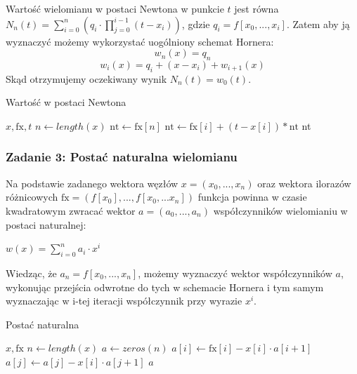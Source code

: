 \documentclass[11pt]{article}
\begin{document}
        \noindent Wartość wielomianu w postaci Newtona w punkcie $t$ jest równa
        $N_n(t) = \sum_{i = 0}^{n}(q_i \cdot \prod_{j = 0}^{i - 1}(t - x_i))$, gdzie $q_i = f[x_0, ..., x_i]$.
        Zatem aby ją wyznaczyć możemy wykorzystać uogólniony schemat Hornera:
        \[ w_n(x) = q_n \]
        \[ w_i(x) = q_i + (x - x_i) + w_{i+1}(x) \]
        Skąd otrzymujemy oczekiwany wynik $N_n(t) = w_0(t)$.

        \begin{algorithm}[h!]
        \caption{Wartość w postaci Newtona}\label{alg:newton_value}
        \begin{algorithmic}[1]
            \Require $x, \text{fx}, t$
            \State $n \gets length(x)$
            \State $\text{nt} \gets \text{fx}[n]$
                \State $\text{nt} \gets \text{fx}[i] + (t - x[i]) * \text{nt}$
            \EndFor
            \State \Return nt
        \end{algorithmic}
        \end{algorithm}

        \noindent \newline

        \subsubsection*{Zadanie 3: Postać naturalna wielomianu}
        Na podstawie zadanego wektora węzłów $x = (x_0, ..., x_n)$ oraz wektora ilorazów różnicowych
        $\text{fx} = (f[x_0], ..., f[x_0, ... x_n])$ funkcja powinna w czasie kwadratowym zwracać wektor
        $a = (a_0, ..., a_n)$ współczynników wielomianiu w postaci naturalnej:
        \begin{center}
        \begin{math}
            w(x) = \sum_{i = 0}^{n}a_i \cdot x^i
        \end{math}
        \end{center}

        \noindent Wiedząc, że $a_n = f[x_0, ..., x_n]$, możemy wyznaczyć wektor współczynników $a$, wykonując przejścia
        odwrotne do tych w schemacie Hornera i tym samym wyznaczając w i-tej iteracji współczynnik przy wyrazie $x^i$.

        \begin{algorithm}[h!]
        \caption{Postać naturalna}\label{alg:natural_coefficients}
        \begin{algorithmic}[1]
            \Require $x, \text{fx}$
            \State $n \gets length(x)$
            \State $a \gets zeros(n)$
                \State $a[i] \gets \text{fx}[i] - x[i] \cdot a[i+1]$
                    \State $a[j] \gets a[j] - x[i] \cdot a[j+1]$
                \EndFor
            \EndFor
            \State \Return $a$
        \end{algorithmic}
        \end{algorithm}
\end{document}
